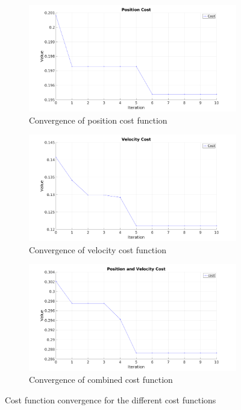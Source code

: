 \begin{figure}[ht]
    \begin{subfigure}{0.5\textwidth}
        \centering
        \includegraphics[width=0.9\linewidth]{images/controllers/pos_cost.png}
        \caption[Position cost function]{Convergence of position cost function}
        \label{fig:pos_cost}
    \end{subfigure}
    \begin{subfigure}{0.5\textwidth}
        \centering
        \includegraphics[width=0.9\linewidth]{images/controllers/vel_cost.png}
        \caption[Velocity cost function]{Convergence of velocity cost function}
        \label{fig:vel_cost}
    \end{subfigure}

    \begin{subfigure}{\textwidth}
        \centering
        \includegraphics[width=0.45\linewidth]{images/controllers/all_cost.png}
        \caption[Combined cost function]{Convergence of combined cost function}
        \label{fig:all_cost}
    \end{subfigure}
    \caption{Cost function convergence for the different cost functions}
    \label{fig:cost_function_optimization}
\end{figure}


